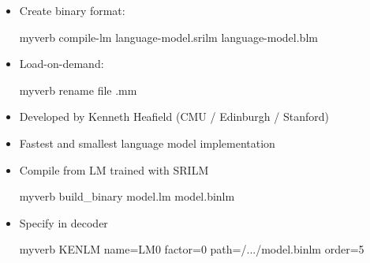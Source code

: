 \documentclass[landscape]{uedslides2C}
\begin{document}
\vspace{30mm}
\begin{itemize}
\item Create binary format: \\[3mm]
\begin{SaveVerbatim}{myverb} 
compile-lm language-model.srilm language-model.blm
\end{SaveVerbatim}
\colorbox{gray}{}

\item Load-on-demand: \\[3mm]
\begin{SaveVerbatim}{myverb} 
rename file .mm  
\end{SaveVerbatim}
\colorbox{gray}{}
\end{itemize}

\vspace{10mm}
\begin{itemize}
\item Developed by Kenneth Heafield (CMU / Edinburgh / Stanford)
\item Fastest and smallest language model implementation
\item Compile from LM trained with SRILM\\[5mm]
\begin{SaveVerbatim}{myverb} 
build_binary model.lm model.binlm
\end{SaveVerbatim}
\colorbox{gray}{}
\item Specify in decoder\\[5mm]
\begin{SaveVerbatim}{myverb} 
KENLM name=LM0 factor=0 path=/.../model.binlm order=5
\end{SaveVerbatim}
\colorbox{gray}{}
\end{itemize}
\end{document}

